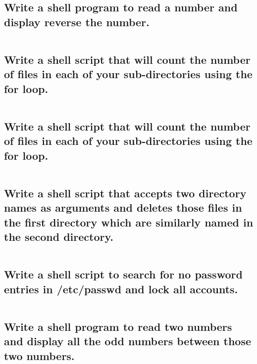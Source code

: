 \inputminted[breaklines, linenos]{shell}{25-09-2020/23.sh}
\subsection{
Write a shell program to read a number and display reverse the number.
}

\inputminted[breaklines, linenos]{shell}{25-09-2020/24.sh}
\subsection{
Write a shell script that will count the number of files in each of your sub-directories using the for loop.
}

\inputminted[breaklines, linenos]{shell}{25-09-2020/25.sh}
\subsection{
Write a shell script that will count the number of files in each of your sub-directories using the for loop.
}

\inputminted[breaklines, linenos]{shell}{25-09-2020/26.sh}
\subsection{
Write a shell script that accepts two directory names as arguments and deletes those files in the first directory which are similarly named in the second directory.
}

\inputminted[breaklines, linenos]{shell}{25-09-2020/27.sh}
\subsection{
Write a shell script to search for no password entries in /etc/passwd and lock all accounts.
}

\inputminted[breaklines, linenos]{shell}{25-09-2020/28.sh}
\subsection{
Write a shell program to read two numbers and display all the odd numbers between those two numbers.
}

\inputminted[breaklines, linenos]{shell}{25-09-2020/29.sh}
